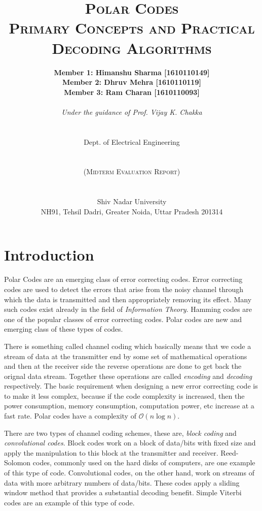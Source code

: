 \documentclass[twocolumn]{report}
\title{\textsc{\Huge Polar Codes} \\ \textsc{Primary Concepts and
Practical Decoding Algorithms}}
\author{\textbf{Member 1: Himanshu Sharma [1610110149]} \\ \textbf{Member 2: Dhruv Mehra [1610110119]} \\ \textbf{Member 3: Ram Charan [1610110093]} \\\\ {\it Under the guidance of Prof. Vijay K. Chakka} \\\\\\ \LARGE{Dept. of Electrical Engineering} \\\\\\ \textsc{(Midterm Evaluation Report)} \\\\\\\LARGE{Shiv Nadar University} \\ NH91, Tehsil Dadri, Greater Noida, Uttar Pradesh 201314}
\date{}
\begin{document}
\maketitle

\section{Introduction}
Polar Codes are an emerging class of error correcting codes. Error correcting codes are used to detect the errors  that arise from the noisy channel through which the data is transmitted and then appropriately removing its effect. Many such codes exist already in the field of \textit{Information Theory}. Hamming codes are one of the popular classes of error correcting codes. Polar codes are new and emerging class of these types of codes.

\par There is something called channel coding which basically means that we code a stream of data at the transmitter end by some set of mathematical operations and then at the  receiver side the reverse operations are done to get back the orignal data stream. Together these operations are called \textit{encoding} and \textit{decoding} respectively. The basic requirement when designing a new error correcting code is to make it less complex, because if the code complexity is increased, then the power consumption, memory consumption, computation power, etc increase at a fast rate. Polar codes have a complexity of $\mathcal{O}(n \log n)$. 

\par There are two types of channel coding schemes, these are, \textit{block coding} and \textit{convolutional codes}.  Block codes work on a block of data/bits with fixed size and apply the manipulation to this block at the transmitter and receiver. Reed-Solomon codes, commonly used on the hard disks of computers, are one example of this type of code. Convolutional codes, on the other hand, work on streams of data with more arbitrary numbers of data/bits. These codes apply a sliding window method that provides a substantial decoding benefit. Simple Viterbi codes are an example of this type of code.
\end{document}
